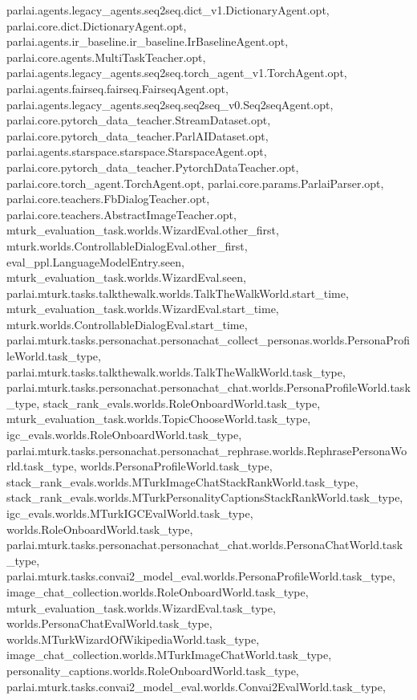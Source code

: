 parlai.\+agents.\+legacy\+\_\+agents.\+seq2seq.\+dict\+\_\+v1.\+Dictionary\+Agent.\+opt, parlai.\+core.\+dict.\+Dictionary\+Agent.\+opt, parlai.\+agents.\+ir\+\_\+baseline.\+ir\+\_\+baseline.\+Ir\+Baseline\+Agent.\+opt, parlai.\+core.\+agents.\+Multi\+Task\+Teacher.\+opt, parlai.\+agents.\+legacy\+\_\+agents.\+seq2seq.\+torch\+\_\+agent\+\_\+v1.\+Torch\+Agent.\+opt, parlai.\+agents.\+fairseq.\+fairseq.\+Fairseq\+Agent.\+opt, parlai.\+agents.\+legacy\+\_\+agents.\+seq2seq.\+seq2seq\+\_\+v0.\+Seq2seq\+Agent.\+opt, parlai.\+core.\+pytorch\+\_\+data\+\_\+teacher.\+Stream\+Dataset.\+opt, parlai.\+core.\+pytorch\+\_\+data\+\_\+teacher.\+Parl\+A\+I\+Dataset.\+opt, parlai.\+agents.\+starspace.\+starspace.\+Starspace\+Agent.\+opt, parlai.\+core.\+pytorch\+\_\+data\+\_\+teacher.\+Pytorch\+Data\+Teacher.\+opt, parlai.\+core.\+torch\+\_\+agent.\+Torch\+Agent.\+opt, parlai.\+core.\+params.\+Parlai\+Parser.\+opt, parlai.\+core.\+teachers.\+Fb\+Dialog\+Teacher.\+opt, parlai.\+core.\+teachers.\+Abstract\+Image\+Teacher.\+opt, mturk\+\_\+evaluation\+\_\+task.\+worlds.\+Wizard\+Eval.\+other\+\_\+first, mturk.\+worlds.\+Controllable\+Dialog\+Eval.\+other\+\_\+first, eval\+\_\+ppl.\+Language\+Model\+Entry.\+seen, mturk\+\_\+evaluation\+\_\+task.\+worlds.\+Wizard\+Eval.\+seen, parlai.\+mturk.\+tasks.\+talkthewalk.\+worlds.\+Talk\+The\+Walk\+World.\+start\+\_\+time, mturk\+\_\+evaluation\+\_\+task.\+worlds.\+Wizard\+Eval.\+start\+\_\+time, mturk.\+worlds.\+Controllable\+Dialog\+Eval.\+start\+\_\+time, parlai.\+mturk.\+tasks.\+personachat.\+personachat\+\_\+collect\+\_\+personas.\+worlds.\+Persona\+Profile\+World.\+task\+\_\+type, parlai.\+mturk.\+tasks.\+talkthewalk.\+worlds.\+Talk\+The\+Walk\+World.\+task\+\_\+type, parlai.\+mturk.\+tasks.\+personachat.\+personachat\+\_\+chat.\+worlds.\+Persona\+Profile\+World.\+task\+\_\+type, stack\+\_\+rank\+\_\+evals.\+worlds.\+Role\+Onboard\+World.\+task\+\_\+type, mturk\+\_\+evaluation\+\_\+task.\+worlds.\+Topic\+Choose\+World.\+task\+\_\+type, igc\+\_\+evals.\+worlds.\+Role\+Onboard\+World.\+task\+\_\+type, parlai.\+mturk.\+tasks.\+personachat.\+personachat\+\_\+rephrase.\+worlds.\+Rephrase\+Persona\+World.\+task\+\_\+type, worlds.\+Persona\+Profile\+World.\+task\+\_\+type, stack\+\_\+rank\+\_\+evals.\+worlds.\+M\+Turk\+Image\+Chat\+Stack\+Rank\+World.\+task\+\_\+type, stack\+\_\+rank\+\_\+evals.\+worlds.\+M\+Turk\+Personality\+Captions\+Stack\+Rank\+World.\+task\+\_\+type, igc\+\_\+evals.\+worlds.\+M\+Turk\+I\+G\+C\+Eval\+World.\+task\+\_\+type, worlds.\+Role\+Onboard\+World.\+task\+\_\+type, parlai.\+mturk.\+tasks.\+personachat.\+personachat\+\_\+chat.\+worlds.\+Persona\+Chat\+World.\+task\+\_\+type, parlai.\+mturk.\+tasks.\+convai2\+\_\+model\+\_\+eval.\+worlds.\+Persona\+Profile\+World.\+task\+\_\+type, image\+\_\+chat\+\_\+collection.\+worlds.\+Role\+Onboard\+World.\+task\+\_\+type, mturk\+\_\+evaluation\+\_\+task.\+worlds.\+Wizard\+Eval.\+task\+\_\+type, worlds.\+Persona\+Chat\+Eval\+World.\+task\+\_\+type, worlds.\+M\+Turk\+Wizard\+Of\+Wikipedia\+World.\+task\+\_\+type, image\+\_\+chat\+\_\+collection.\+worlds.\+M\+Turk\+Image\+Chat\+World.\+task\+\_\+type, personality\+\_\+captions.\+worlds.\+Role\+Onboard\+World.\+task\+\_\+type, parlai.\+mturk.\+tasks.\+convai2\+\_\+model\+\_\+eval.\+worlds.\+Convai2\+Eval\+World.\+task\+\_\+type, 